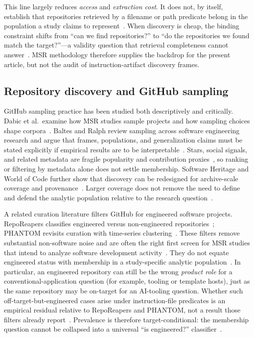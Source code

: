 This line largely reduces \emph{access} and \emph{extraction cost}.
It does not, by itself, establish that repositories retrieved by a filename or path predicate belong in the population a study claims to represent~\cite{kalliamvakou2015indepth,baltes2022sampling}.
When discovery is cheap, the binding constraint shifts from ``can we find repositories?'' to ``do the repositories we found match the target?''---a validity question that retrieval completeness cannot answer~\cite{baltes2022sampling,wohlin2012}.
MSR methodology therefore supplies the backdrop for the present article, but not the audit of instruction-artifact discovery frames.

\subsection{Repository discovery and GitHub sampling}
\label{subsec:rw-discovery}

GitHub sampling practice has been studied both descriptively and critically.
Dabic et al.\ examine how MSR studies sample projects and how sampling choices shape corpora~\cite{dabic2021sampling}.
Baltes and Ralph review sampling across software engineering research and argue that frames, populations, and generalization claims must be stated explicitly if empirical results are to be interpretable~\cite{baltes2022sampling}.
Stars, social signals, and related metadata are fragile popularity and contribution proxies~\cite{borges2016popularity,tsay2014influence}, so ranking or filtering by metadata alone does not settle membership.
Software Heritage and World of Code further show that discovery can be redesigned for archive-scale coverage and provenance~\cite{ma2019woc,pietri2019swh,dicossmo2017softwareheritage}.
Larger coverage does not remove the need to define and defend the analytic population relative to the research question~\cite{baltes2022sampling}.

A related curation literature filters GitHub for engineered software projects.
RepoReapers classifies engineered versus non-engineered repositories~\cite{munaiah2017curating}; PHANTOM revisits curation with time-series clustering~\cite{phantom2020}.
These filters remove substantial non-software noise and are often the right first screen for MSR studies that intend to analyze software development activity~\cite{munaiah2017curating,phantom2020,kalliamvakou2015indepth}.
They do not equate engineered status with membership in a study-specific analytic population~\cite{baltes2022sampling,wohlin2012}.
In particular, an engineered repository can still be the wrong \emph{product role} for a conventional-application question (for example, tooling or template hosts), just as the same repository may be on-target for an AI-tooling question.
Whether such off-target-but-engineered cases arise under instruction-file predicates is an empirical residual relative to RepoReapers and PHANTOM, not a result those filters already report~\cite{munaiah2017curating,phantom2020}.
Prevalence is therefore target-conditional: the membership question cannot be collapsed into a universal ``is engineered?'' classifier~\cite{baltes2022sampling,wohlin2012}.

